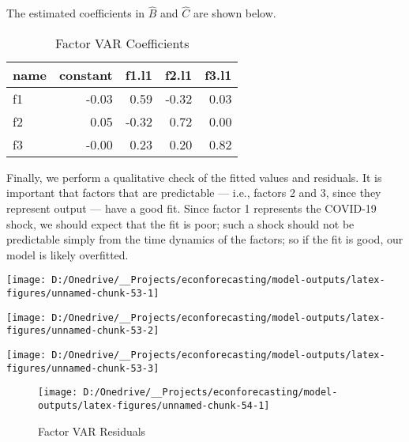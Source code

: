 \documentclass[11pt, letterpaper]{article}\usepackage[]{graphicx}\usepackage[]{color}
\begin{document}
The estimated coefficients in $\widehat{B}$ and $\widehat{C}$ are shown below.
\begin{table}[H]
\centering
\begingroup\footnotesize
\begin{tabular}{lrrrr}
  \hline
name & constant & f1.l1 & f2.l1 & f3.l1 \\ 
  \hline
f1 & -0.03 & 0.59 & -0.32 & 0.03 \\ 
  f2 & 0.05 & -0.32 & 0.72 & 0.00 \\ 
  f3 & -0.00 & 0.23 & 0.20 & 0.82 \\ 
   \hline
\end{tabular}
\endgroup
\caption{Factor VAR Coefficients} 
\end{table}



Finally, we perform a qualitative check of the fitted values and residuals. It is important that factors that are predictable --- i.e., factors 2 and 3, since they represent output --- have a good fit. Since factor 1 represents the COVID-19 shock, we should expect that the fit is poor; such a shock should not be predictable simply from the time dynamics of the factors; so if the fit is good, our model is likely overfitted.


{\centering \texttt{[image: D:/Onedrive/\_\_Projects/econforecasting/model-outputs/latex-figures/unnamed-chunk-53-1]} 

}




{\centering \texttt{[image: D:/Onedrive/\_\_Projects/econforecasting/model-outputs/latex-figures/unnamed-chunk-53-2]} 

}




{\centering \texttt{[image: D:/Onedrive/\_\_Projects/econforecasting/model-outputs/latex-figures/unnamed-chunk-53-3]} 

}





\begin{figure}[H]

{\centering \texttt{[image: D:/Onedrive/\_\_Projects/econforecasting/model-outputs/latex-figures/unnamed-chunk-54-1]} 

}

\caption[Factor VAR Residuals]{Factor VAR Residuals}\label{fig:unnamed-chunk-54}
\end{figure}
\end{document}
